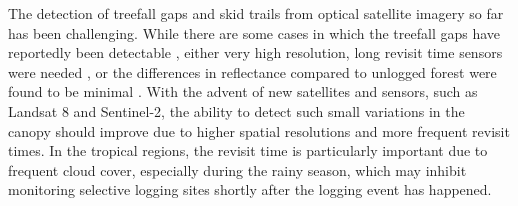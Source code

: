 \documentclass[a4paper,12pt]{scrbook}
\begin{document}
The detection of treefall gaps and skid trails from optical satellite imagery so far has been challenging. While there are some cases in which the treefall gaps have reportedly been detectable \citep{frolking_forest_2009}, either very high resolution, long revisit time sensors were needed \citep{read_spatial_2003}, or the differences in reflectance compared to unlogged forest were found to be minimal \citep{asner_canopy_2004, broadbent_recovery_2006}. With the advent of new satellites and sensors, such as Landsat 8 and Sentinel-2, the ability to detect such small variations in the canopy should improve due to higher spatial resolutions and more frequent revisit times. In the tropical regions, the revisit time is particularly important due to frequent cloud cover, especially during the rainy season, which may inhibit monitoring selective logging sites shortly after the logging event has happened.
\end{document}
